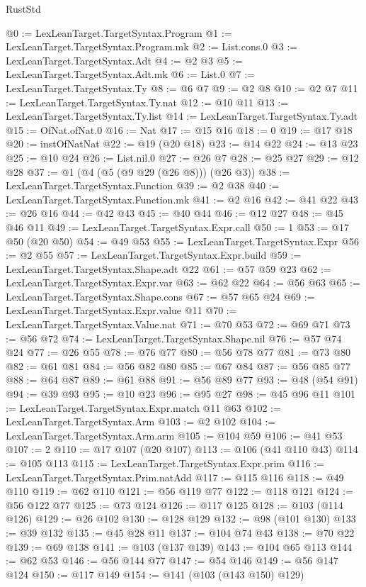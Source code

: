 \begin{lexlean}{RustStd}
\begin{coremodule}
{\begin{coremodule}
{{{{{{{@0 := LexLeanTarget.TargetSyntax.Program
@1 := LexLeanTarget.TargetSyntax.Program.mk
@2 := List.cons.{0}
@3 := LexLeanTarget.TargetSyntax.Adt
@4 := @2 @3
@5 := LexLeanTarget.TargetSyntax.Adt.mk
@6 := List.{0}
@7 := LexLeanTarget.TargetSyntax.Ty
@8 := @6 @7
@9 := @2 @8
@10 := @2 @7
@11 := LexLeanTarget.TargetSyntax.Ty.nat
@12 := @10 @11
@13 := LexLeanTarget.TargetSyntax.Ty.list
@14 := LexLeanTarget.TargetSyntax.Ty.adt
@15 := OfNat.ofNat.{0}
@16 := Nat
@17 := @15 @16
@18 := 0
@19 := @17 @18
@20 := instOfNatNat
@22 := @19 (@20 @18)
@23 := @14 @22
@24 := @13 @23
@25 := @10 @24
@26 := List.nil.{0}
@27 := @26 @7
@28 := @25 @27
@29 := @12 @28
@37 := @1 (@4 (@5 (@9 @29 (@26 @8))) (@26 @3))
@38 := LexLeanTarget.TargetSyntax.Function
@39 := @2 @38
@40 := LexLeanTarget.TargetSyntax.Function.mk
@41 := @2 @16
@42 := @41 @22
@43 := @26 @16
@44 := @42 @43
@45 := @40 @44
@46 := @12 @27
@48 := @45 @46 @11
@49 := LexLeanTarget.TargetSyntax.Expr.call
@50 := 1
@53 := @17 @50 (@20 @50)
@54 := @49 @53
@55 := LexLeanTarget.TargetSyntax.Expr
@56 := @2 @55
@57 := LexLeanTarget.TargetSyntax.Expr.build
@59 := LexLeanTarget.TargetSyntax.Shape.adt @22
@61 := @57 @59 @23
@62 := LexLeanTarget.TargetSyntax.Expr.var
@63 := @62 @22
@64 := @56 @63
@65 := LexLeanTarget.TargetSyntax.Shape.cons
@67 := @57 @65 @24
@69 := LexLeanTarget.TargetSyntax.Expr.value @11
@70 := LexLeanTarget.TargetSyntax.Value.nat
@71 := @70 @53
@72 := @69 @71
@73 := @56 @72
@74 := LexLeanTarget.TargetSyntax.Shape.nil
@76 := @57 @74 @24
@77 := @26 @55
@78 := @76 @77
@80 := @56 @78 @77
@81 := @73 @80
@82 := @61 @81
@84 := @56 @82 @80
@85 := @67 @84
@87 := @56 @85 @77
@88 := @64 @87
@89 := @61 @88
@91 := @56 @89 @77
@93 := @48 (@54 @91)
@94 := @39 @93
@95 := @10 @23
@96 := @95 @27
@98 := @45 @96 @11
@101 := LexLeanTarget.TargetSyntax.Expr.match @11 @63
@102 := LexLeanTarget.TargetSyntax.Arm
@103 := @2 @102
@104 := LexLeanTarget.TargetSyntax.Arm.arm
@105 := @104 @59
@106 := @41 @53
@107 := 2
@110 := @17 @107 (@20 @107)
@113 := @106 (@41 @110 @43)
@114 := @105 @113
@115 := LexLeanTarget.TargetSyntax.Expr.prim
@116 := LexLeanTarget.TargetSyntax.Prim.natAdd
@117 := @115 @116
@118 := @49 @110
@119 := @62 @110
@121 := @56 @119 @77
@122 := @118 @121
@124 := @56 @122 @77
@125 := @73 @124
@126 := @117 @125
@128 := @103 (@114 @126)
@129 := @26 @102
@130 := @128 @129
@132 := @98 (@101 @130)
@133 := @39 @132
@135 := @45 @28 @11
@137 := @104 @74 @43
@138 := @70 @22
@139 := @69 @138
@141 := @103 (@137 @139)
@143 := @104 @65 @113
@144 := @62 @53
@146 := @56 @144 @77
@147 := @54 @146
@149 := @56 @147 @124
@150 := @117 @149
@154 := @141 (@103 (@143 @150) @129)
}}}}}}}
\end{coremodule}}
\end{coremodule}
\end{lexlean}
